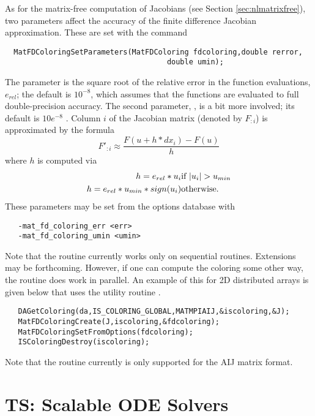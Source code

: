 As for the matrix-free computation of Jacobians (see Section
\ref{sec:nlmatrixfree}), two parameters affect the accuracy of the
finite difference Jacobian approximation.  These are set with the command
\begin{verbatim}
  MatFDColoringSetParameters(MatFDColoring fdcoloring,double rerror,
                                     double umin);
\end{verbatim}
The parameter  is the square root of 
the relative error in the function evaluations, $e_{rel}$; the default is $ 10^{-8} $, which assumes
that the functions are evaluated to full double-precision accuracy. The 
second parameter, , is a bit more involved; its default is 
$ 10e^{-8} $ .  Column $i$ of the Jacobian matrix (denoted by $F_{:i}$) is 
approximated by the formula
\[
    F'_{:i} \approx \frac{F(u + h*dx_{i}) - F(u)}{h}
\]
where $ h $ is computed via 
\begin{eqnarray*}
        h = e_{rel}*u_{i}             &    \hbox{if }  |u_{i}| > u_{min} \\
        h = e_{rel}*u_{min}*sign(u_{i})  &    \hbox{otherwise}.
\end{eqnarray*}
These parameters may be set from the options database with 
\begin{verbatim}
   -mat_fd_coloring_err <err>
   -mat_fd_coloring_umin <umin>
\end{verbatim}
 

Note that the  routine currently 
works only on sequential routines.  Extensions may be forthcoming. However,
if one can compute the coloring  some other way, the routine
 does work in parallel. An example of this for 
2D distributed arrays is given below that uses the utility routine
. 

\begin{verbatim}
   DAGetColoring(da,IS_COLORING_GLOBAL,MATMPIAIJ,&iscoloring,&J);
   MatFDColoringCreate(J,iscoloring,&fdcoloring); 
   MatFDColoringSetFromOptions(fdcoloring);
   ISColoringDestroy(iscoloring);
\end{verbatim}

Note that the routine  currently is only 
supported for the AIJ matrix format.

\chapter{TS: Scalable ODE Solvers}
\label{chapter:ts}

